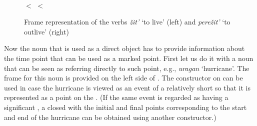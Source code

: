 \begin{figure}\small
\begin{minipage}{0.3\textwidth}\centering
{}
\end{minipage}\hfill%
\begin{minipage}{0.55\textwidth}\centering
{}\\
 $<$  $<$ 
\end{minipage}
\caption{Frame representation of the verbs \textit{\v{z}it'} `to live' (left) and \textit{pere\v{z}it'} `to outlive' (right) \label{frame:live}}
\end{figure}

Now the noun that is used as a direct object has to provide information about the time point that can be used as a marked point. First let us do it with a noun that can be seen as referring directly to such point, e.g., \textit{uragan} `hurricane'. The frame for this noun is provided on the left side of . The constructor on  can be used in case the hurricane is viewed as an event of a relatively short  so that it is represented as a point on the . (If the same event is regarded as having a significant , a closed  with the initial and final points corresponding to the start and end of the hurricane can be obtained using another constructor.) 

